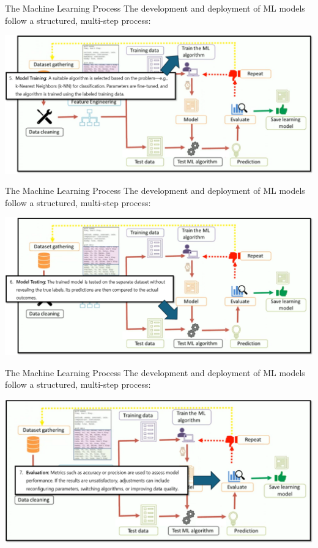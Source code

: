 \documentclass[11pt]{beamer}
\begin{document}
\begin{frame}{The Machine Learning Process}
The development and deployment of ML models follow a structured, multi-step process:

	\begin{center}
	\includegraphics[scale=0.38]{../05-pictures/lesson-1-1_pic_16.png}
	\end{center}
\end{frame}
\begin{frame}{The Machine Learning Process}
The development and deployment of ML models follow a structured, multi-step process:

	\begin{center}
	\includegraphics[scale=0.38]{../05-pictures/lesson-1-1_pic_17.png}
	\end{center}
\end{frame}
\begin{frame}{The Machine Learning Process}
The development and deployment of ML models follow a structured, multi-step process:

	\begin{center}
	\includegraphics[scale=0.4]{../05-pictures/lesson-1-1_pic_18.png}
	\end{center}
\end{frame}
\end{document}
